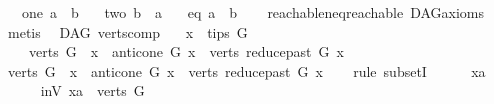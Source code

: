 \begin{isabellebody}
\ \ {\isacharbar}{\kern0pt}\ {\isacharparenleft}{\kern0pt}one{\isacharparenright}{\kern0pt}\ {\isachardoublequoteopen}a\ {\isasymrightarrow}\isactrlsup {\isacharplus}{\kern0pt}\ b{\isachardoublequoteclose}\isanewline
\ \ {\isacharbar}{\kern0pt}\ {\isacharparenleft}{\kern0pt}two{\isacharparenright}{\kern0pt}\ {\isachardoublequoteopen}b\ {\isasymrightarrow}\isactrlsup {\isacharplus}{\kern0pt}\ a{\isachardoublequoteclose}\isanewline
\ \ {\isacharbar}{\kern0pt}\ {\isacharparenleft}{\kern0pt}eq{\isacharparenright}{\kern0pt}\ {\isachardoublequoteopen}a\ {\isacharequal}{\kern0pt}\ b{\isachardoublequoteclose}\isanewline
%
\isadelimproof
\ \ %
\endisadelimproof
%
\isatagproof
{}\isamarkupfalse%
\ reachable{\isacharunderscore}{\kern0pt}neq{\isacharunderscore}{\kern0pt}reachable{}\ DAG{\isacharunderscore}{\kern0pt}axioms\isanewline
\ \ \isamarkupfalse%
\ metis%
\endisatagproof
{\isafoldproof}%
%
\isadelimproof
\isanewline
%
\endisadelimproof
\isanewline
{}\isamarkupfalse%
\ {\isacharparenleft}{\kern0pt}\ DAG{\isacharparenright}{\kern0pt}\ verts{\isacharunderscore}{\kern0pt}comp{\isacharcolon}{\kern0pt}\isanewline
\ \ \ {\isachardoublequoteopen}x\ {\isasymin}\ tips\ G{\isachardoublequoteclose}\isanewline
\ \ \ {\isachardoublequoteopen}\ verts\ G\ {\isacharequal}{\kern0pt}\ {\isacharbraceleft}{\kern0pt}x{\isacharbraceright}{\kern0pt}\ {\isasymunion}\ {\isacharparenleft}{\kern0pt}anticone\ G\ x{\isacharparenright}{\kern0pt}\ {\isasymunion}\ {\isacharparenleft}{\kern0pt}verts\ {\isacharparenleft}{\kern0pt}reduce{\isacharunderscore}{\kern0pt}past\ G\ x{\isacharparenright}{\kern0pt}{\isacharparenright}{\kern0pt}{\isachardoublequoteclose}\isanewline
%
\isadelimproof
%
\endisadelimproof
%
\isatagproof
{}\isamarkupfalse%
\ \isanewline
\ \ \isamarkupfalse%
\ {\isachardoublequoteopen}verts\ G\ {\isasymsubseteq}\ {\isacharbraceleft}{\kern0pt}x{\isacharbraceright}{\kern0pt}\ {\isasymunion}\ anticone\ G\ x\ {\isasymunion}\ verts\ {\isacharparenleft}{\kern0pt}reduce{\isacharunderscore}{\kern0pt}past\ G\ x{\isacharparenright}{\kern0pt}{\isachardoublequoteclose}\ \isanewline
\ \ \isamarkupfalse%
{\isacharparenleft}{\kern0pt}rule\ subsetI{\isacharparenright}{\kern0pt}\isanewline
\ \ \ \ \isamarkupfalse%
\ xa\ \isanewline
\ \ \ \ \isamarkupfalse%
\ in{\isacharunderscore}{\kern0pt}V{\isacharcolon}{\kern0pt}\ {\isachardoublequoteopen}xa\ {\isasymin}\ verts\ G{\isachardoublequoteclose}\isanewline

\end{isabellebody}
